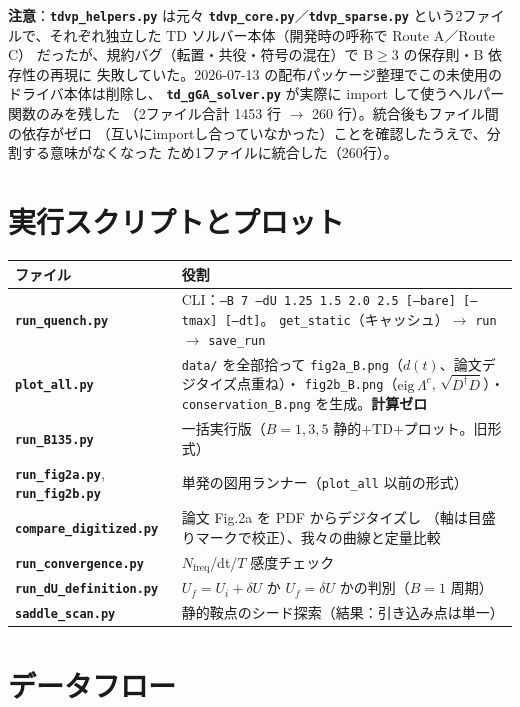 \documentclass[11pt]{ltjsarticle}
\newcommand{\code}[1]{\texttt{#1}}
\newcommand{\file}[1]{\textbf{\texttt{#1}}}
\begin{document}
\textbf{注意}：\file{tdvp\_helpers.py} は元々 \file{tdvp\_core.py}／\file{tdvp\_sparse.py}
という2ファイルで、それぞれ独立した TD ソルバー本体（開発時の呼称で Route A／Route C）
だったが、規約バグ（転置・共役・符号の混在）で B\(\ge\)3 の保存則・B 依存性の再現に
失敗していた。2026-07-13 の配布パッケージ整理でこの未使用のドライバ本体は削除し、
\file{td\_gGA\_solver.py} が実際に import して使うヘルパー関数のみを残した
（2ファイル合計 1453 行 $\to$ 260 行）。統合後もファイル間の依存がゼロ
（互いにimportし合っていなかった）ことを確認したうえで、分割する意味がなくなった
ため1ファイルに統合した（260行）。

\section{実行スクリプトとプロット}

\begin{longtable}{p{}p{}}
\toprule
ファイル & 役割 \\
\midrule
\file{run\_quench.py} & CLI：\code{--B 7 --dU 1.25 1.5 2.0 2.5 [--bare] [--tmax] [--dt]}。
\code{get\_static}（キャッシュ）$\to$ \code{run} $\to$ \code{save\_run} \\
\file{plot\_all.py} & \code{data/} を全部拾って
\code{fig2a\_B.png}（$d(t)$、論文デジタイズ点重ね）・
\code{fig2b\_B.png}（$\mathrm{eig}\,\Lambda^c$, $\sqrt{D^\dagger D}$）・
\code{conservation\_B.png} を生成。\textbf{計算ゼロ} \\
\file{run\_B135.py} & 一括実行版（$B=1,3,5$ 静的$+$TD$+$プロット。旧形式） \\
\file{run\_fig2a.py}, \file{run\_fig2b.py} & 単発の図用ランナー（\code{plot\_all} 以前の形式） \\
\file{compare\_digitized.py} & 論文 Fig.2a を PDF からデジタイズし
（軸は目盛りマークで校正）、我々の曲線と定量比較 \\
\file{run\_convergence.py} & $N_\text{freq}$/dt/$T$ 感度チェック \\
\file{run\_dU\_definition.py} & $U_f=U_i+\delta U$ か $U_f=\delta U$ かの判別（$B=1$ 周期） \\
\file{saddle\_scan.py} & 静的鞍点のシード探索（結果：引き込み点は単一） \\
\bottomrule
\end{longtable}

\section{データフロー}
\end{document}
